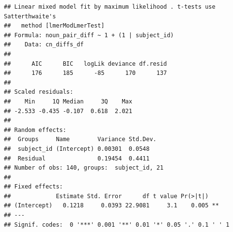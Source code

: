 \documentclass[
  doc,floatsintext]{apa6}
\begin{document}
\begin{verbatim}
## Linear mixed model fit by maximum likelihood . t-tests use Satterthwaite's
##   method [lmerModLmerTest]
## Formula: noun_pair_diff ~ 1 + (1 | subject_id)
##    Data: cn_diffs_df
## 
##      AIC      BIC   logLik deviance df.resid 
##      176      185      -85      170      137 
## 
## Scaled residuals: 
##    Min     1Q Median     3Q    Max 
## -2.533 -0.435 -0.107  0.618  2.021 
## 
## Random effects:
##  Groups     Name        Variance Std.Dev.
##  subject_id (Intercept) 0.00301  0.0548  
##  Residual               0.19454  0.4411  
## Number of obs: 140, groups:  subject_id, 21
## 
## Fixed effects:
##             Estimate Std. Error      df t value Pr(>|t|)   
## (Intercept)   0.1218     0.0393 22.9081     3.1    0.005 **
## ---
## Signif. codes:  0 '***' 0.001 '**' 0.01 '*' 0.05 '.' 0.1 ' ' 1
\end{verbatim}
\end{document}
